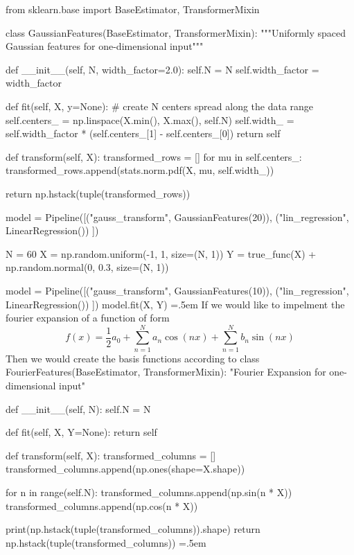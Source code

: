\documentclass{article}
\newenvironment{cverbatim}
 {\SaveVerbatim{cverb}}
 {\endSaveVerbatim
  \flushleft\fboxrule=0pt\fboxsep=.5em
  \colorbox{cverbbg}{%
    \makebox[\dimexpr\linewidth-2\fboxsep][l]{\BUseVerbatim{cverb}}%
  }
  \endflushleft
}
\theoremstyle{definition}
\theoremstyle{remark}
\theoremstyle{definition}
\begin{document}
\begin{cverbatim}
from sklearn.base import BaseEstimator, TransformerMixin

class GaussianFeatures(BaseEstimator, TransformerMixin):
    """Uniformly spaced Gaussian features for one-dimensional input"""
    
    def __init__(self, N, width_factor=2.0):
        self.N = N
        self.width_factor = width_factor
        
    def fit(self, X, y=None):
        # create N centers spread along the data range
        self.centers_ = np.linspace(X.min(), X.max(), self.N)
        self.width_ = self.width_factor * (self.centers_[1] - self.centers_[0])
        return self
        
    def transform(self, X): 
        transformed_rows = []
        for mu in self.centers_: 
            transformed_rows.append(stats.norm.pdf(X, mu, self.width_))
        
        return np.hstack(tuple(transformed_rows))

model = Pipeline([("gauss_transform", GaussianFeatures(20)), 
                  ("lin_regression", LinearRegression())
                  ]) 

N = 60
X = np.random.uniform(-1, 1, size=(N, 1)) 
Y = true_func(X) + np.random.normal(0, 0.3, size=(N, 1)) 

model = Pipeline([("gauss_transform", GaussianFeatures(10)), 
              ("lin_regression", LinearRegression())
              ]) 
model.fit(X, Y)
\end{cverbatim} 
If we would like to impelment the fourier expansion of a function of form 
\[f(x) = \frac{1}{2} a_0 + \sum_{n=1}^N a_n \cos(n x) + \sum_{n=1}^N b_n \sin(n x)\]
Then we would create the basis functions according to 
\begin{cverbatim}
class FourierFeatures(BaseEstimator, TransformerMixin): 
    "Fourier Expansion for one-dimensional input"
    
    def __init__(self, N): 
        self.N = N 
        
    def fit(self, X, Y=None): 
        return self
    
    def transform(self, X): 
        transformed_columns = [] 
        transformed_columns.append(np.ones(shape=X.shape))
        
        for n in range(self.N): 
            transformed_columns.append(np.sin(n * X))
            transformed_columns.append(np.cos(n * X))
            
        print(np.hstack(tuple(transformed_columns)).shape)
        return np.hstack(tuple(transformed_columns))
\end{cverbatim} 
\end{document}
